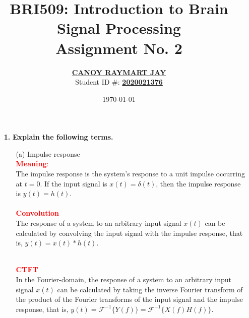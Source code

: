 \documentclass[a4paper, 12pt]{article}
\begin{document}
\title{BRI509: Introduction to Brain Signal Processing \\ Assignment No. 2}
\author{\underline{\textbf{CANOY RAYMART JAY}} \\ Student ID \#: \underline{\textbf{2020021376}}}
\date{\today}
\maketitle

\begin{itemize}
\item[\textbf{1.}]{\textbf{Explain the following terms.}}
\begin{itemize}
\item[(a)]{Impulse response}\\
\textcolor{red}{\textbf{Meaning}:} \\
The impulse response is the system's response to a unit impulse occurring at $t = 0$. If the input signal is $x(t) = \delta(t)$, then the impulse response is $y(t) = h(t)$.\\
\vspace{0.0001cm} \\
\noindent\textcolor{red}{\textbf{Convolution}}\\
The response of a system to an arbitrary input signal $x(t)$ can be calculated by convolving the input signal with the impulse response, that is, $y(t) = x(t)*h(t)$.
\begin{figure}[h!]
\end{figure}
\vspace{0.0001cm} \\
\noindent\textcolor{red}{\textbf{CTFT}}\\
In the Fourier-domain, the response of a system to an arbitrary input signal $x(t)$ can be calculated by taking the inverse Fourier transform of the product of the Fourier transforms of the input signal and the impulse response, that is, $y(t) = \mathcal{F}^{-1}\{Y(f)\} = \mathcal{F}^{-1}\{X(f)H(f)\}$.
\begin{figure}[h!]
\end{figure}


\end{itemize}
\end{itemize}
\end{document}
